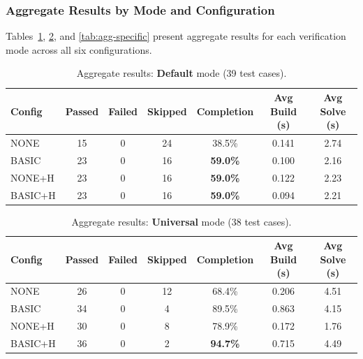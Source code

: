 \subsubsection*{Aggregate Results by Mode and Configuration}

Tables~\ref{tab:agg-default}, \ref{tab:agg-universal}, and \ref{tab:agg-specific} present aggregate results for each verification mode across all six configurations.

\begin{table}[H]
\centering
\caption{Aggregate results: \textbf{Default} mode (39 test cases).}
\label{tab:agg-default}
\begin{tabular}{lcccccc}
\toprule
\textbf{Config} & \textbf{Passed} & \textbf{Failed} & \textbf{Skipped} & \textbf{Completion} & \textbf{Avg Build (s)} & \textbf{Avg Solve (s)} \\
\midrule
NONE       & 15 &  0 & 24 & 38.5\% & 0.141 & 2.74 \\
BASIC      & 23 &  0 & 16 & \textbf{59.0\%} & 0.100 & 2.16 \\
NONE+H     & 23 &  0 & 16 & \textbf{59.0\%} & 0.122 & 2.23 \\
BASIC+H    & 23 &  0 & 16 & \textbf{59.0\%} & 0.094 & 2.21 \\
\bottomrule
\end{tabular}
\end{table}
\vspace{-2em}
\begin{table}[H]
\centering
\caption{Aggregate results: \textbf{Universal} mode (38 test cases).}
\label{tab:agg-universal}
\begin{tabular}{lcccccc}
\toprule
\textbf{Config} & \textbf{Passed} & \textbf{Failed} & \textbf{Skipped} & \textbf{Completion} & \textbf{Avg Build (s)} & \textbf{Avg Solve (s)} \\
\midrule
NONE       & 26 &  0 & 12 & 68.4\% & 0.206 & 4.51 \\
BASIC      & 34 &  0 &  4 & 89.5\% & 0.863 & 4.15 \\
NONE+H     & 30 &  0 &  8 & 78.9\% & 0.172 & 1.76 \\
BASIC+H    & 36 &  0 &  2 & \textbf{94.7\%} & 0.715 & 4.49 \\
\bottomrule
\end{tabular}
\end{table}
\vspace{-2em}
